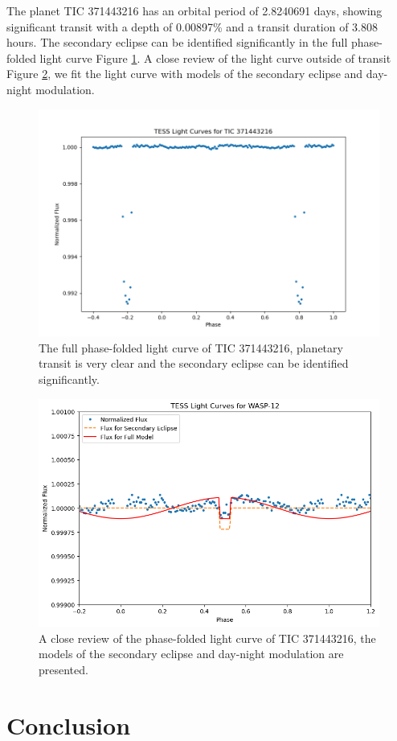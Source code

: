 \documentclass{article}
\begin{document}
The planet TIC 371443216 has an orbital period of 2.8240691 days, showing significant transit with a depth of 0.00897\% and a transit duration of 3.808 hours. The secondary eclipse can be identified significantly in the full phase-folded light curve Figure \ref{fig:371443216_folded}. A close review of the light curve outside of transit Figure \ref{fig:371443216}, we fit the light curve with models of the secondary eclipse and day-night modulation.\begin{figure}[H]\centering\includegraphics[width=0.7\linewidth]{image/371443216_folded.png}\captionsetup{font=small} \caption{The full phase-folded light curve of TIC 371443216, planetary transit is very clear and the secondary eclipse can be identified significantly.}\label{fig:371443216_folded}\end{figure}\begin{figure}[H]\centering\includegraphics[width=0.65\linewidth]{image/371443216.png}\captionsetup{font=small} \caption{A close review of the phase-folded light curve of TIC 371443216, the models of the secondary eclipse and day-night modulation are presented.}\label{fig:371443216}\end{figure}
\newpage
\section{Conclusion}
\end{document}
